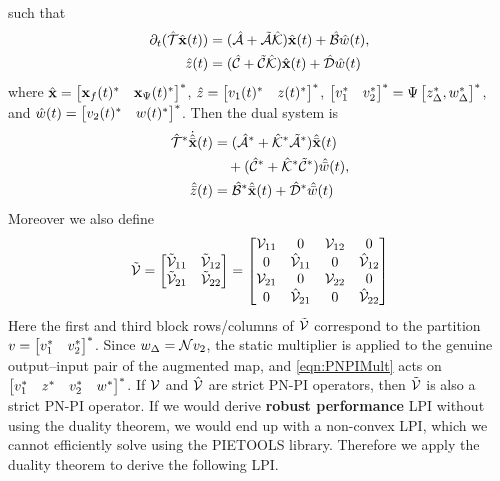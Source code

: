 such that
\begin{equation*}
	\begin{aligned}
		\partial_t(\hat{\mathcal{T}}{\hat{\mathbf{x}}}(t))
			&= (\hat{\mathcal{A}}+\tilde{\mathcal{A}}\hat{\mathcal{K}})
			\hat{\mathbf{x}}(t)+\hat{\mathcal{B}}\hat{w}(t), \\
		\hat{z}(t)
			&= (\hat{\mathcal{C}}+\tilde{\mathcal{C}}\hat{\mathcal{K}})
			\hat{\mathbf{x}}(t)+\hat{\mathcal{D}}\hat{w}(t)
	\end{aligned}
\end{equation*}
where $\hat{\mathbf{x}} = \begin{bmatrix}\mathbf{x}_f(t)^* & \mathbf{x}_\Psi(t)^*\end{bmatrix}^*$,
$\hat{z} = \begin{bmatrix}v_1(t)^* & z(t)^*\end{bmatrix}^*$,
$\begin{bmatrix}v_1^*&v_2^*\end{bmatrix}^* = \Psi\begin{bmatrix}z_\Delta^*, w_\Delta^*\end{bmatrix}^*$, and
$\hat{w}(t) = \begin{bmatrix}v_2(t)^* & w(t)^*\end{bmatrix}^*$. Then the dual system is
\begin{equation*}
	\begin{aligned}
		\hat{\mathcal{T}}^*\dot{\hat{\bar{\mathbf{x}}}}(t)
			&= (\hat{\mathcal{A}}^*+\hat{\mathcal{K}}^*\tilde{\mathcal{A}}^*)
			\hat{\bar{\mathbf{x}}}(t) \\
			&\quad+ (\hat{\mathcal{C}}^*+\hat{\mathcal{K}}^*\tilde{\mathcal{C}}^*)
			\hat{\bar{w}}(t), \\
		\hat{\bar{z}}(t)
			&= \hat{\mathcal{B}}^*\hat{\bar{\mathbf{x}}}(t)
			+ \hat{\mathcal{D}}^*\hat{\bar{w}}(t)
	\end{aligned}
\end{equation*}
Moreover we also define
\begin{equation}\label{eqn:PNPIMult}
	\tilde{\mathcal{V}}
	=
	\begin{bmatrix}
		\tilde{\mathcal{V}}_{11} & \tilde{\mathcal{V}}_{12} \\
		\tilde{\mathcal{V}}_{21} & \tilde{\mathcal{V}}_{22}
	\end{bmatrix}
	=
	\begin{bmatrix}
		\mathcal{V}_{11} & 0 & \mathcal{V}_{12} & 0 \\
		0 & \hat{\mathcal{V}}_{11} & 0 & \hat{\mathcal{V}}_{12} \\
		\mathcal{V}_{21} & 0 & \mathcal{V}_{22} & 0 \\
		0 & \hat{\mathcal{V}}_{21} & 0 & \hat{\mathcal{V}}_{22}
	\end{bmatrix}
\end{equation}
Here the first and third block rows/columns of \(\tilde{\mathcal{V}}\) correspond
to the partition \(v=\begin{bmatrix}v_1^* & v_2^*\end{bmatrix}^*\). Since
\(w_\Delta=\mathcal{N} v_2\), the static multiplier is applied to the genuine
output--input pair of the augmented map, and \eqref{eqn:PNPIMult} acts on
\(\begin{bmatrix}v_1^*&z^*&v_2^*&w^*\end{bmatrix}^*\).
If $\mathcal{V}$ and $\hat{\mathcal{V}}$ are {strict PN-PI} operators, then $\tilde{\mathcal{V}}$ is also a {strict PN-PI} operator. If we would derive \textbf{robust performance} LPI without using the duality
theorem, we would end up with a non-convex LPI, which we cannot efficiently
solve using the PIETOOLS library. Therefore we apply the duality theorem to
derive the following LPI.

